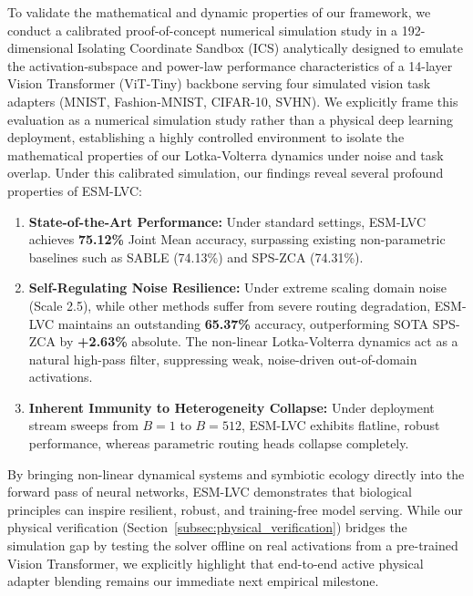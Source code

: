 To validate the mathematical and dynamic properties of our framework, we conduct a calibrated proof-of-concept numerical simulation study in a 192-dimensional Isolating Coordinate Sandbox (ICS) analytically designed to emulate the activation-subspace and power-law performance characteristics of a 14-layer Vision Transformer (ViT-Tiny) backbone serving four simulated vision task adapters (MNIST, Fashion-MNIST, CIFAR-10, SVHN). We explicitly frame this evaluation as a numerical simulation study rather than a physical deep learning deployment, establishing a highly controlled environment to isolate the mathematical properties of our Lotka-Volterra dynamics under noise and task overlap. Under this calibrated simulation, our findings reveal several profound properties of ESM-LVC:
\begin{enumerate}
    \item \textbf{State-of-the-Art Performance:} Under standard settings, ESM-LVC achieves \textbf{75.12\%} Joint Mean accuracy, surpassing existing non-parametric baselines such as SABLE (74.13\%) and SPS-ZCA (74.31\%).
    \item \textbf{Self-Regulating Noise Resilience:} Under extreme scaling domain noise (Scale 2.5), while other methods suffer from severe routing degradation, ESM-LVC maintains an outstanding \textbf{65.37\%} accuracy, outperforming SOTA SPS-ZCA by \textbf{+2.63\%} absolute. The non-linear Lotka-Volterra dynamics act as a natural high-pass filter, suppressing weak, noise-driven out-of-domain activations.
    \item \textbf{Inherent Immunity to Heterogeneity Collapse:} Under deployment stream sweeps from $B=1$ to $B=512$, ESM-LVC exhibits flatline, robust performance, whereas parametric routing heads collapse completely.
\end{enumerate}

By bringing non-linear dynamical systems and symbiotic ecology directly into the forward pass of neural networks, ESM-LVC demonstrates that biological principles can inspire resilient, robust, and training-free model serving. While our physical verification (Section~\ref{subsec:physical_verification}) bridges the simulation gap by testing the solver offline on real activations from a pre-trained Vision Transformer, we explicitly highlight that end-to-end active physical adapter blending remains our immediate next empirical milestone.
